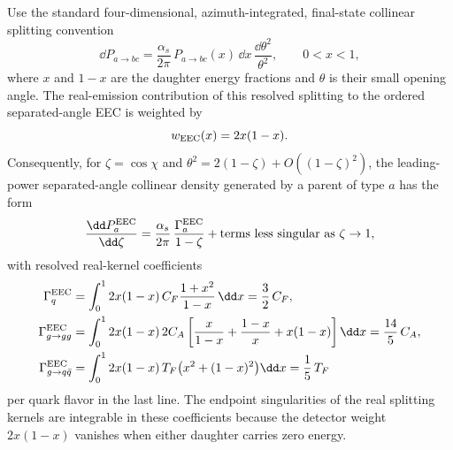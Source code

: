 \begin{lemma}
\label{lem:qcd-eec-tree-collinear-coefficient}
Use the standard four-dimensional, azimuth-integrated, final-state collinear
splitting convention
\begin{equation}
  \dd P_{a\to bc}
  =
  \frac{\alpha_s}{2\pi}\,
  P_{a\to bc}(x)\,\dd x\,\frac{\dd\theta^2}{\theta^2},
  \qquad 0<x<1,
  \label{eq:final-state-collinear-splitting-convention}
\end{equation}
where \(x\) and \(1-x\) are the daughter energy fractions and \(\theta\) is
their small opening angle.  The real-emission contribution of this resolved
splitting to the ordered separated-angle EEC is weighted by
\begin{equation}
  w_{\rm EEC}(x)=2x(1-x).
  \label{eq:eec-ordered-collinear-weight}
\end{equation}
Consequently, for \(\zeta=\cos\chi\) and
\(\theta^2=2(1-\zeta)+O((1-\zeta)^2)\), the leading-power separated-angle
collinear density generated by a parent of type \(a\) has the form
\begin{equation}
  \frac{\dd P_a^{\rm EEC}}{\dd\zeta}
  =
  \frac{\alpha_s}{2\pi}\,
  \frac{\Gamma_a^{\rm EEC}}{1-\zeta}
  +
  \text{terms less singular as }\zeta\to1,
  \label{eq:eec-tree-collinear-density}
\end{equation}
with resolved real-kernel coefficients
\begin{equation}
\begin{aligned}
  \Gamma_q^{\rm EEC}
  &=
  \int_0^1 2x(1-x)\,
  C_F\frac{1+x^2}{1-x}\,\dd x
  =
  \frac32\,C_F,                                      \\
  \Gamma_{g\to gg}^{\rm EEC}
  &=
  \int_0^1 2x(1-x)\,
  2C_A\left[
    \frac{x}{1-x}+\frac{1-x}{x}+x(1-x)
  \right]\dd x
  =
  \frac{14}{5}\,C_A,                                 \\
  \Gamma_{g\to q\bar q}^{\rm EEC}
  &=
  \int_0^1 2x(1-x)\,
  T_F\bigl(x^2+(1-x)^2\bigr)\dd x
  =
  \frac15\,T_F
\end{aligned}
\label{eq:eec-real-collinear-coefficients}
\end{equation}
per quark flavor in the last line.  The endpoint singularities of the real
splitting kernels are integrable in these coefficients because the detector
weight \(2x(1-x)\) vanishes when either daughter carries zero energy.
\end{lemma}

